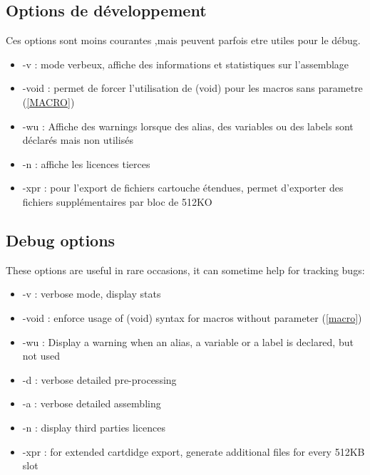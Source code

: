 \begin{xfr}
\subsection{Options de développement}
Ces options sont moins courantes ,mais peuvent parfois etre utiles pour le débug.
\begin{itemize}
\item -v : mode verbeux, affiche des informations et statistiques sur l'assemblage
\item -void : permet de forcer l'utilisation de (void) pour les macros sans parametre (\ref{MACRO})
\item -wu : Affiche des warnings lorsque des alias, des variables ou des labels sont déclarés mais non utilisés
\item -n : affiche les licences tierces
\item -xpr : pour l'export de fichiers cartouche étendues, permet d'exporter des fichiers supplémentaires par bloc de 512KO
\end{itemize}

\end{xfr}

\begin{xen}
\subsection{Debug options}
These options are useful in rare occasions, it can sometime help for tracking bugs:
\begin{itemize}
\item -v : verbose mode, display stats
\item -void : enforce usage of (void) syntax for macros without parameter (\ref{macro})
\item -wu : Display a warning when an alias, a variable or a label is declared, but not used
\item -d : verbose detailed pre-processing
\item -a : verbose detailed assembling
\item -n : display third parties licences
\item -xpr : for extended cartdidge export, generate additional files for every 512KB slot
\end{itemize}

\end{xen}

